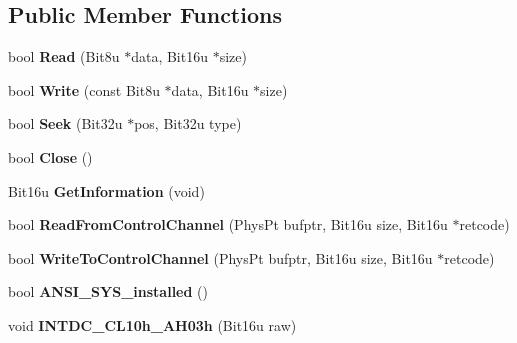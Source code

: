 \subsection*{Public Member Functions}
\begin{DoxyCompactItemize}
\item 
\hypertarget{classdevice__CON_a748000d06f15adcb17f329e32eda83fb}{bool {\bfseries Read} (Bit8u $\ast$data, Bit16u $\ast$size)}\label{classdevice__CON_a748000d06f15adcb17f329e32eda83fb}

\item 
\hypertarget{classdevice__CON_a46c071095c3de95fa316d90c5443fd5f}{bool {\bfseries Write} (const Bit8u $\ast$data, Bit16u $\ast$size)}\label{classdevice__CON_a46c071095c3de95fa316d90c5443fd5f}

\item 
\hypertarget{classdevice__CON_a6d744c09531d7691b538a7f13b3cef7a}{bool {\bfseries Seek} (Bit32u $\ast$pos, Bit32u type)}\label{classdevice__CON_a6d744c09531d7691b538a7f13b3cef7a}

\item 
\hypertarget{classdevice__CON_a69784b10d975098ba5fd46dc4cf33593}{bool {\bfseries Close} ()}\label{classdevice__CON_a69784b10d975098ba5fd46dc4cf33593}

\item 
\hypertarget{classdevice__CON_a8db295befbc8bf8ba25504e65241a4fe}{Bit16u {\bfseries Get\-Information} (void)}\label{classdevice__CON_a8db295befbc8bf8ba25504e65241a4fe}

\item 
\hypertarget{classdevice__CON_aed3d4935317137834c51fbba69221c8f}{bool {\bfseries Read\-From\-Control\-Channel} (Phys\-Pt bufptr, Bit16u size, Bit16u $\ast$retcode)}\label{classdevice__CON_aed3d4935317137834c51fbba69221c8f}

\item 
\hypertarget{classdevice__CON_a6b8675aaab24d4ceeed07a669b8bb512}{bool {\bfseries Write\-To\-Control\-Channel} (Phys\-Pt bufptr, Bit16u size, Bit16u $\ast$retcode)}\label{classdevice__CON_a6b8675aaab24d4ceeed07a669b8bb512}

\item 
\hypertarget{classdevice__CON_a96dfd24fded133a4628b675e30ac493c}{bool {\bfseries A\-N\-S\-I\-\_\-\-S\-Y\-S\-\_\-installed} ()}\label{classdevice__CON_a96dfd24fded133a4628b675e30ac493c}

\item 
\hypertarget{classdevice__CON_a3077748c2aa7cc77405d8a9f80cf89d1}{void {\bfseries I\-N\-T\-D\-C\-\_\-\-C\-L10h\-\_\-\-A\-H03h} (Bit16u raw)}\label{classdevice__CON_a3077748c2aa7cc77405d8a9f80cf89d1}


\end{DoxyCompactItemize}
